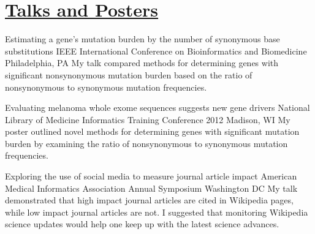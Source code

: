 \documentclass [10pt, letterpaper]{moderncv}
\begin{document}

\nocite{*}

%



\section {\href{http://bit.ly/9F9a08}{Talks and Posters}}

         {Estimating a gene's mutation burden by the number of synonymous base substitutions}
         {IEEE International Conference on Bioinformatics and 
          Biomedicine}
         {Philadelphia, PA}
         {}
         {My talk compared methods for determining genes with significant nonsynonymous 
          mutation burden based on the ratio of nonsynonymous to synonymous mutation frequencies.}

         {Evaluating melanoma whole exome sequences suggests new gene drivers}
         {National Library of Medicine Informatics Training Conference 2012}
         {Madison, WI}
         {}
         {My poster outlined novel methods for determining genes with significant mutation 
          burden by examining the ratio of nonsynonymous to synonymous mutation frequencies.}

         {Exploring the use of social media to measure journal article impact}
         {American Medical Informatics Association Annual Symposium}
         {Washington DC}
         {}
         {My talk demonstrated that high impact journal articles are cited in Wikipedia pages, 
          while low impact journal articles are not. I suggested that monitoring Wikipedia science 
          updates would help one keep up with the latest science advances.}
\end{document}
